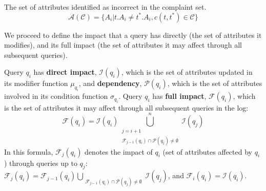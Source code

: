 \begin{definition} 
	The set of attributes identified as incorrect in the complaint set.
	\[\mathcal{A}(\mathcal{C}) = \{A_i | t.A_i \neq t^*.A_i, c(t,t^*) \in \mathcal{C}\}\]
\end{definition} 


We proceed to define the impact that a query has directly (the set of
attributes it modifies), and its full impact (the set of attributes it may
affect through all subsequent queries).

\begin{definition} \label{eq:dependency}
    Query $q_i$ has \textbf{direct impact}, $\mathcal{I}(q_i)$, which is
    the set of attributes updated in its modifier function $\mu_{q_i}$,
    and \textbf{dependency},
    $\mathcal{P}(q_i)$, which is the set of attributes involved in its
    condition function $\sigma_{q_i}$.
    Query $q_i$ has \textbf{full impact}, $\mathcal{F}(q_i)$, which is the set of attributes it may affect through all subsequent queries in the log:
    \[
    \mathcal{F}(q_i)=\mathcal{I}(q_i)\bigcup_{\substack{j=i+1\\ \mathcal{F}_{j-1}(q_{i})\cap \mathcal{P}(q_j) \neq \emptyset}}^n \mathcal{I}(q_j)
    \]
    In this formula, $\mathcal{F}_j(q_i)$ denotes the impact of $q_i$ (set of attributes affected by $q_i$) through queries up to $q_j$:
    \\    $\mathcal{F}_j(q_i)\!=\!\mathcal{F}_{j-1}(q_i)\bigcup_{\substack{\mathcal{F}_{j-1}(q_i)\cap \mathcal{P}(q_j) \neq \emptyset}} \mathcal{I}(q_j)$, and $\mathcal{F}_i(q_i)\! =\! \mathcal{I}(q_i)$.
    
    
\end{definition}

